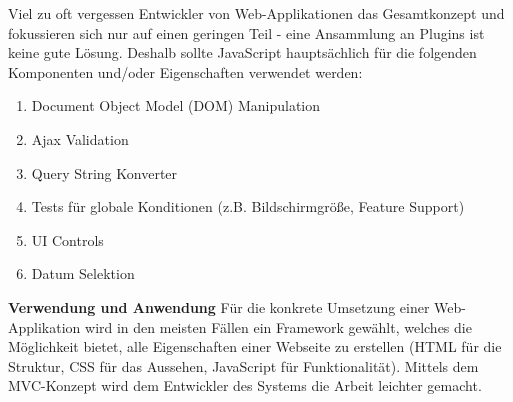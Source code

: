 \begin{description}
Viel zu oft vergessen Entwickler von Web-Applikationen das Gesamtkonzept und fokussieren sich nur auf einen geringen Teil - eine Ansammlung an Plugins ist keine gute Lösung. Deshalb sollte JavaScript hauptsächlich für die folgenden Komponenten und/oder Eigenschaften verwendet werden:
\begin{enumerate}
\item Document Object Model (DOM) Manipulation
\item Ajax Validation
\item Query String Konverter
\item Tests für globale Konditionen (z.B. Bildschirmgröße, Feature Support)
\item UI Controls
\item Datum Selektion
\end{enumerate}
\end{description}

\textbf{Verwendung und Anwendung\newline}
\label{subsec:jsframeworks}
Für die konkrete Umsetzung einer Web-Applikation wird in den meisten Fällen ein Framework gewählt, welches die Möglichkeit bietet, alle Eigenschaften einer Webseite zu erstellen (HTML für die Struktur, CSS für das Aussehen, JavaScript für Funktionalität). Mittels dem MVC-Konzept \cite{MELD.CH3-web-app.js4} wird dem Entwickler des Systems die Arbeit leichter gemacht.

